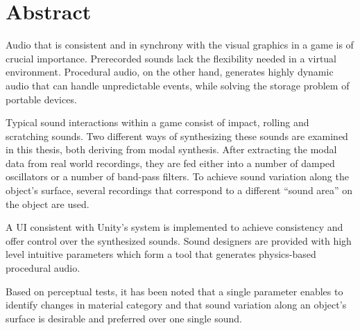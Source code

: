 \chapter*{Abstract}

Audio that is consistent and in synchrony with the visual graphics in a game is of crucial importance. Prerecorded sounds lack the flexibility needed in a virtual environment. Procedural audio, on the other hand, generates highly dynamic audio that can handle unpredictable events, while solving the storage problem of portable devices. 

Typical sound interactions within a game consist of impact, rolling and scratching sounds. Two different ways of synthesizing these sounds are examined in this thesis, both deriving from modal synthesis. After extracting the modal data from real world recordings, they are fed either into a number of damped oscillators or a number of band-pass filters. To achieve sound variation along the object's surface, several recordings that correspond to a different ``sound area'' on the object are used.

A UI consistent with Unity\textsuperscript{\textregistered}'s system is implemented to achieve consistency and offer control over the synthesized sounds. Sound designers are provided with high level intuitive parameters which form a tool that generates physics-based procedural audio.

Based on perceptual tests, it has been noted that a single parameter enables to identify changes in material category and that sound variation along an object's surface is desirable and preferred over one single sound.
